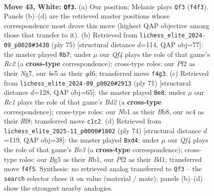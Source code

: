 \documentclass[11pt]{article}
\begin{document}
\clearpage

\begin{figure}[p]\centering
\begin{subfigure}{0.46\textwidth}\centering
\resizebox{\linewidth}{!}{%
\newchessgame
\chessboard[
  setfen={r3k3/7p/bq2p3/p2pbpB1/P1np1Q1P/8/5P2/RNR1N1K1 w - - 6 43},
  showmover=false,
  pgfstyle=straightmove, color=movearrow, markmove={f4-f3}
]}
\caption{}
\end{subfigure}\hfill
\begin{subfigure}{0.46\textwidth}\centering
\resizebox{\linewidth}{!}{%
\newchessgame
\chessboard[
  setfen={5r1k/2r2qnp/3Q2b1/2PP2Pp/4P3/p4N1B/K2N1P2/2R5 b - - 0 38},
  showmover=false,
  pgfstyle=straightmove, color=movearrow, markmove={c7-b7}
]}
\caption{}
\end{subfigure}
\\[4pt]
\begin{subfigure}{0.46\textwidth}\centering
\resizebox{\linewidth}{!}{%
\newchessgame
\chessboard[
  setfen={1b3rk1/2nb1p2/1p3q1p/1P1BN3/5P2/2NQ2P1/6K1/5R2 b - - 0 36},
  showmover=false,
  pgfstyle=straightmove, color=movearrow, markmove={d7-e8}
]}
\caption{}
\end{subfigure}\hfill
\begin{subfigure}{0.46\textwidth}\centering
\resizebox{\linewidth}{!}{%
\newchessgame
\chessboard[
  setfen={k4r2/p4p1p/2n1p1n1/q2pP1P1/2pb2P1/4B3/2Q4P/1R1B1R1K w - - 0 38},
  showmover=false,
  pgfstyle=straightmove, color=movearrow, markmove={e3-d4}
]}
\caption{}
\end{subfigure}
\caption{\textbf{Move 43, White: \texttt{Qf3}.} (a) Our position; Melanie plays \texttt{Qf3} (\texttt{f4f3}). Panels (b)--(d) are the retrieved master positions whose correspondence most drove this move (highest QAP objective among those that transfer to it). (b) Retrieved from \texttt{lichess\_elite\_2024-09\_p0028\#3430} (ply 75) [structural distance $d$=114, QAP obj=77]: the master played \texttt{Rb7}; under $\mu$ our \emph{Qf4} plays the role of that game's \emph{Rc2} (a \textbf{cross-type} correspondence); cross-type roles: our \emph{P}f2 as their \emph{N}g7, our \emph{b}e5 as their \emph{q}d6; transferred move \texttt{f4g3}. (c) Retrieved from \texttt{lichess\_elite\_2024-09\_p0020\#2913} (ply 71) [structural distance $d$=128, QAP obj=65]: the master played \texttt{Be8}; under $\mu$ our \emph{Rc1} plays the role of that game's \emph{Bd2} (a \textbf{cross-type} correspondence); cross-type roles: our \emph{N}b1 as their \emph{B}b8, our \emph{n}c4 as their \emph{R}f8; transferred move \texttt{c1c2}. (d) Retrieved from \texttt{lichess\_elite\_2025-11\_p0000\#1802} (ply 74) [structural distance $d$=119, QAP obj=38]: the master played \texttt{Bxd4}; under $\mu$ our \emph{Qf4} plays the role of that game's \emph{Be3} (a \textbf{cross-type} correspondence); cross-type roles: our \emph{B}g5 as their \emph{R}b1, our \emph{P}f2 as their \emph{B}d1; transferred move \texttt{f4f5}. Synthesis: no retrieved analog transferred to \texttt{Qf3} -- the \texttt{search} selector chose it on value (material / mate); panels (b)--(d) show the strongest nearby analogies.}
\label{fig:thought-m84}
\end{figure}
\end{document}

